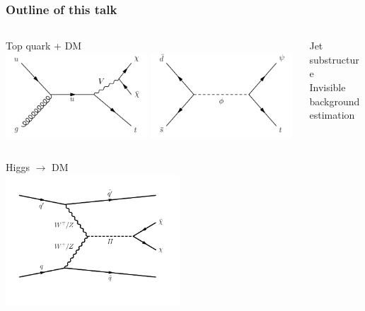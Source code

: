 \documentclass[aspectratio=169,xcolor=dvipsnames,,table,compress]{beamer}
\begin{document}
\begin{frame}  \frametitle{Outline of this talk}
  \vspace{-5mm}
  \begin{columns}[T]
    \begin{column}{0.5\textwidth}
      \centering
    \end{column}
    \begin{column}{0.5\textwidth}
      \centering
    \end{column}
  \end{columns}
  \begin{columns}
    \begin{column}{0.5\textwidth}
      \begin{center}
        Top quark + DM \\ 
        \includegraphics[width=0.49\textwidth]{../figures/monotop/diagrams/fcncb.pdf}
        \includegraphics[width=0.49\textwidth]{../figures/monotop/diagrams/resonant.pdf}
      \end{center}
      \pause
    \end{column}
    \begin{column}{0.5\textwidth}
      \centering
      Jet substructure
      \\ Invisible background estimation
    \end{column}
  \end{columns}
  \pause
  \begin{columns}
    \begin{column}{0.5\textwidth}
      \begin{center}
        Higgs $\rightarrow$ DM \\ 
        \includegraphics[width=0.49\textwidth]{../figures/vbf/diagrams/vbf_hinv.pdf}

\end{center}
\end{column}
\end{columns}
\end{frame}
\end{document}
